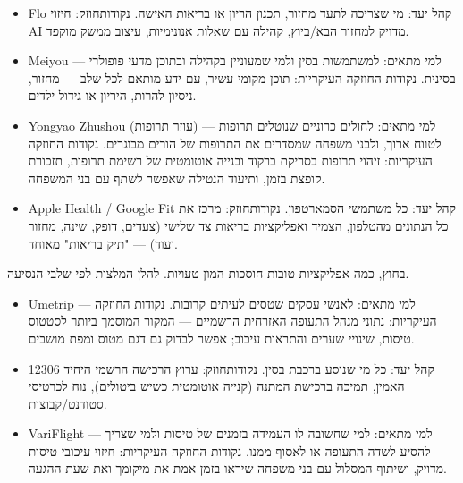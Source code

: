 
\begin{itemize}
  \item Flo קהל יעד: מי שצריכה לתעד מחזור, תכנון הריון או בריאות האישה. נקודותחוזק: חיזוי AI מדויק למחזור הבא/ביוץ, קהילה עם שאלות אנונימיות, עיצוב ממשק מוקפד.
  \item Meiyou — למי מתאים: למשתמשות בסין ולמי שמעוניין בקהילה ובתוכן מדעי פופולרי בסינית. נקודות החוזקה העיקריות: תוכן מקומי עשיר, עם ידע מותאם לכל שלב — מחזור, ניסיון להרות, היריון או גידול ילדים.
\end{itemize}


\begin{itemize}
  \item Yongyao Zhushou (עוזר תרופות) — למי מתאים: לחולים כרוניים שנוטלים תרופות לטווח ארוך, ולבני משפחה שמסדרים את התרופות של הורים מבוגרים. נקודות החוזקה העיקריות: זיהוי תרופות בסריקת ברקוד ובנייה אוטומטית של רשימת תרופות, תזכורת קופצת בזמן, ותיעוד הנטילה שאפשר לשתף עם בני המשפחה.
\end{itemize}


\begin{itemize}
  \item Apple Health / Google Fit קהל יעד: כל משתמשי הסמארטפון. נקודותחוזק: מרכז את כל הנתונים מהטלפון, הצמיד ואפליקציות בריאות צד שלישי (צעדים, דופק, שינה, מחזור ועוד) — "תיק בריאות" מאוחד.
\end{itemize}


בחוץ, כמה אפליקציות טובות חוסכות המון טעויות. להלן המלצות לפי שלבי הנסיעה.


\begin{itemize}
  \item Umetrip — למי מתאים: לאנשי עסקים שטסים לעיתים קרובות. נקודות החוזקה העיקריות: נתוני מנהל התעופה האזרחית הרשמיים — המקור המוסמך ביותר לסטטוס טיסות, שינויי שערים והתראות עיכוב; אפשר לבדוק גם דגם מטוס ומפת מושבים.
  \item 12306 קהל יעד: כל מי שנוסע ברכבת בסין. נקודותחוזק: ערוץ הרכישה הרשמי היחיד האמין, תמיכה ברכישת המתנה (קנייה אוטומטית כשיש ביטולים), נוח לכרטיסי סטודנט/קבוצות.
  \item VariFlight — למי מתאים: למי שחשובה לו העמידה בזמנים של טיסות ולמי שצריך להסיע לשדה התעופה או לאסוף ממנו. נקודות החוזקה העיקריות: חיזוי עיכובי טיסות מדויק, ושיתוף המסלול עם בני משפחה שיראו בזמן אמת את מיקומך ואת שעת ההגעה.
\end{itemize}

